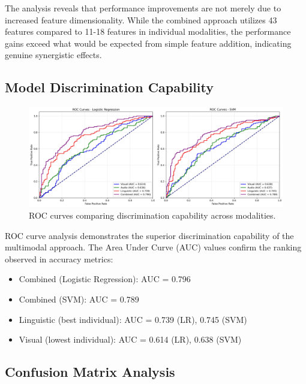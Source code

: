 The analysis reveals that performance improvements are not merely due to increased feature dimensionality. While the combined approach utilizes 43 features compared to 11-18 features in individual modalities, the performance gains exceed what would be expected from simple feature addition, indicating genuine synergistic effects.

\subsection{Model Discrimination Capability}

\begin{figure}[H]
    \centering
    \includegraphics[width=\textwidth]{sections/roc_curves.jpg}
    \caption{ROC curves comparing discrimination capability across modalities.}\label{fig:roc_curves}
\end{figure}

ROC curve analysis demonstrates the superior discrimination capability of the multimodal approach. The Area Under Curve (AUC) values confirm the ranking observed in accuracy metrics:
\begin{itemize}
    \item Combined (Logistic Regression): AUC = 0.796
    \item Combined (SVM): AUC = 0.789
    \item Linguistic (best individual): AUC = 0.739 (LR), 0.745 (SVM)
    \item Visual (lowest individual): AUC = 0.614 (LR), 0.638 (SVM)
\end{itemize}

\subsection{Confusion Matrix Analysis}

